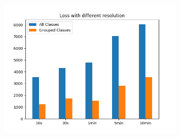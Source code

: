 \documentclass[aspectratio=169,11pt,hyperref={colorlinks=true}]{beamer}
\begin{document}
\begin{frame}
\begin{columns}
\begin{center}
\begin{figure}
        \end{figure}
        \begin{figure}
          \includegraphics[width=0.8\textwidth,height=0.4\textheight]{graphs/loss_by_sampling-compare-classes.png}
        \end{figure}
        \end{center}
  \end{columns}
\end{frame}
\end{document}

